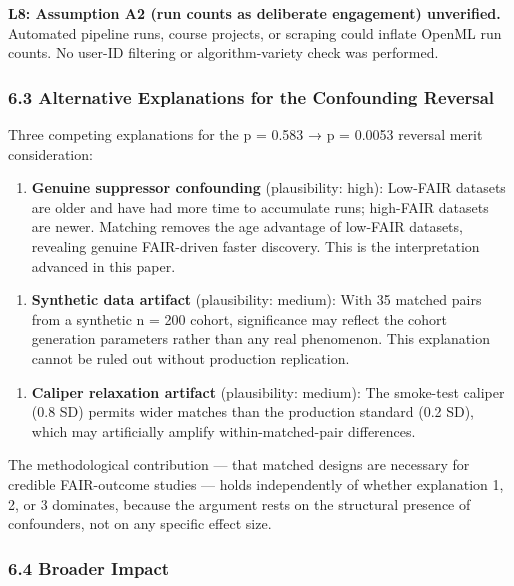 \textbf{L8: Assumption A2 (run counts as deliberate engagement) unverified.} Automated pipeline runs, course projects, or scraping could inflate OpenML run counts. No user-ID filtering or algorithm-variety check was performed.

\subsubsection{6.3 Alternative Explanations for the Confounding Reversal}

Three competing explanations for the p = 0.583 → p = 0.0053 reversal merit consideration:

\begin{enumerate}
\item \textbf{Genuine suppressor confounding} (plausibility: high): Low-FAIR datasets are older and have had more time to accumulate runs; high-FAIR datasets are newer. Matching removes the age advantage of low-FAIR datasets, revealing genuine FAIR-driven faster discovery. This is the interpretation advanced in this paper.
\end{enumerate}

\begin{enumerate}
\item \textbf{Synthetic data artifact} (plausibility: medium): With 35 matched pairs from a synthetic n = 200 cohort, significance may reflect the cohort generation parameters rather than any real phenomenon. This explanation cannot be ruled out without production replication.
\end{enumerate}

\begin{enumerate}
\item \textbf{Caliper relaxation artifact} (plausibility: medium): The smoke-test caliper (0.8 SD) permits wider matches than the production standard (0.2 SD), which may artificially amplify within-matched-pair differences.
\end{enumerate}

The methodological contribution — that matched designs are necessary for credible FAIR-outcome studies — holds independently of whether explanation 1, 2, or 3 dominates, because the argument rests on the structural presence of confounders, not on any specific effect size.

\subsubsection{6.4 Broader Impact}

